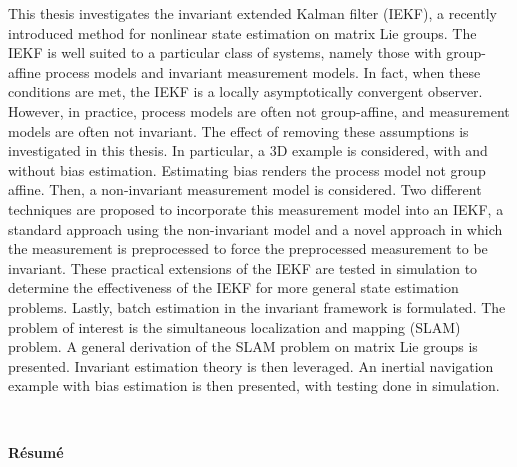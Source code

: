 This thesis investigates the invariant extended Kalman filter (IEKF), a recently introduced method for nonlinear state estimation on matrix Lie groups.
The IEKF is well suited to a particular class of systems, namely those with group-affine process models and invariant measurement models.
In fact, when these conditions are met, the IEKF is a locally asymptotically convergent observer.
However, in practice, process models are often not group-affine, and measurement models are often not invariant.
The effect of removing these assumptions is investigated in this thesis.
In particular, a 3D example is considered, with and without bias estimation.
Estimating bias renders the process model not group affine.
Then, a non-invariant measurement model is considered.
Two different techniques are proposed to incorporate this measurement model into an IEKF, a standard approach using the non-invariant model and a novel approach in which the measurement is preprocessed to force the preprocessed measurement to be invariant.
These practical extensions of the IEKF are tested in simulation to determine the effectiveness of the IEKF for more general state estimation problems.
Lastly, batch estimation in the invariant framework is formulated.
The problem of interest is the simultaneous localization and mapping (SLAM) problem.
A general derivation of the SLAM problem on matrix Lie groups is presented.
Invariant estimation theory is then leveraged. 
An inertial navigation example with bias estimation is then presented, with testing done in simulation.

\cleardoublepage

\newpage
{}
\hbox{ }
\twoinmar
{}
\centerline{\large\bf R\'esum\'e}
\vspace{0.7in}
\onehalfspacing

